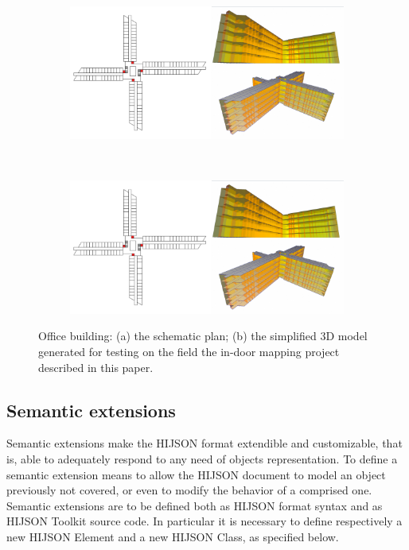 \begin{figure}[!h]
 \centering
 \begin{subfigure}[b]{0.48\linewidth}
 \includegraphics[width=\textwidth]{images/sogei-a} 
 \caption{}
 \label{fig:sogei-a}
 \end{subfigure}
 ~
 \begin{subfigure}[b]{0.48\linewidth}
 \includegraphics[width=\textwidth]{images/sogei-b}
 \caption{}
 \label{fig:sogei-b}
 \end{subfigure}
 
 \caption{Office building: 
 (a) the schematic plan; 
 (b) the simplified 3D model generated for testing on the field 
 the in-door mapping project described in this paper.
 }
 \label{fig:sogei}
\end{figure}

\subsection{Semantic extensions}\label{semantic-extensions}

Semantic extensions make the HIJSON format extendible and customizable, that
is, able to adequately respond to any need of objects representation. To define a
semantic extension means to allow the HIJSON document to model an object
previously not covered, or even to modify the behavior of a comprised one.
Semantic extensions are to be defined both as HIJSON format syntax and as
HIJSON Toolkit source code. In particular it is necessary to define respectively
a new HIJSON Element and a new HIJSON Class, as specified below.

